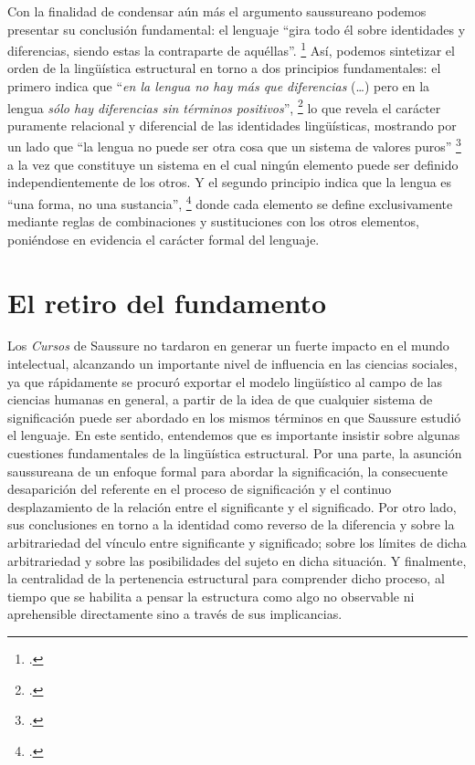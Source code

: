 Con la finalidad de condensar aún más el argumento saussureano podemos presentar su conclusión fundamental: el lenguaje \enquote{gira todo él sobre identidades y diferencias, siendo estas la contraparte de aquéllas}. \footcite[][230]{@6996-SAUSSURE2007} Así, podemos sintetizar el orden de la lingüística estructural en torno a dos principios fundamentales: el primero indica que \enquote{\emph{en la lengua no hay más que diferencias} (\ldots) pero en la lengua \emph{sólo hay diferencias sin términos positivos}}, \footcite[][247]{@6996-SAUSSURE2007} lo que revela el carácter puramente relacional y diferencial de las identidades lingüísticas, mostrando por un lado que \enquote{la lengua no puede ser otra cosa que un sistema de valores puros} \footcite[][235]{@6996-SAUSSURE2007} a la vez que constituye un sistema en el cual ningún elemento puede ser definido independientemente de los otros. Y el segundo principio indica que la lengua es \enquote{una forma, no una sustancia}, \footcite[][237]{@6996-SAUSSURE2007} donde cada elemento se define exclusivamente mediante reglas de combinaciones y sustituciones con los otros elementos, poniéndose en evidencia el carácter formal del lenguaje.

\section{El retiro del fundamento}

Los \emph{Cursos} de Saussure no tardaron en generar un fuerte impacto en el mundo intelectual, alcanzando un importante nivel de influencia en las ciencias sociales, ya que rápidamente se procuró exportar el modelo lingüístico al campo de las ciencias humanas en general, a partir de la idea de que cualquier sistema de significación puede ser abordado en los mismos términos en que Saussure estudió el lenguaje. En este sentido, entendemos que es importante insistir sobre algunas cuestiones fundamentales de la lingüística estructural. Por una parte, la asunción saussureana de un enfoque formal para abordar la significación, la consecuente desaparición del referente en el proceso de significación y el continuo desplazamiento de la relación entre el significante y el significado. Por otro lado, sus conclusiones en torno a la identidad como reverso de la diferencia y sobre la arbitrariedad del vínculo entre significante y significado; sobre los límites de dicha arbitrariedad y sobre las posibilidades del sujeto en dicha situación. Y finalmente, la centralidad de la pertenencia estructural para comprender dicho proceso, al tiempo que se habilita a pensar la estructura como algo no observable ni aprehensible directamente sino a través de sus implicancias.

